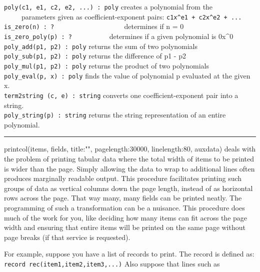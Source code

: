 \texttt{poly(c1, e1, c2, e2, ...) : poly} creates a polynomial from
the\\
 \ \ \ \ \ parameters given as coefficient-exponent pairs:
\texttt{c1x\^{}e1 + c2x\^{}e2 + ...}\\
\texttt{is\_zero(n) : ?
\ }\ \ \ \ \ \ \ \ \ \ \ \ \ \ \ \ \ \ determines if n = 0\\
\texttt{is\_zero\_poly(p) : ?} \ \ \ \ \ \ \ \ \ \ determines if a given
polynomial is 0x\^{}0\\
\texttt{poly\_add(p1, p2) : poly} returns the sum of two
polynomials\\
\texttt{poly\_sub(p1, p2) : poly} returns the difference of p1 -
p2\\
\texttt{poly\_mul(p1, p2) : poly} returns the product of two
polynomials\\
\texttt{poly\_eval(p, x) : poly} finds the value of polynomial p
evaluated at the given x.\\
\texttt{term2string (c, e) : string} converts one coefficient-exponent
pair into a string.\\
\texttt{poly\_string(p) : string} returns the string representation of
an entire polynomial. 

\vspace{0.25cm}\hrule{}

printcol(items, fields, title:"",
pagelength:30000, linelength:80, auxdata) deals with the problem of
printing tabular data where the total width of items to be printed is
wider than the page. Simply allowing the data to wrap to additional
lines often produces marginally readable output. This procedure
facilitates printing such groups of data as vertical columns down the
page length, instead of as horizontal rows across the page. That way
many, many fields can be printed neatly. The programming of such a
transformation can be a nuisance. This procedure does much of the work
for you, like deciding how many items can fit across the page width and
ensuring that entire items will be printed on the same page without
page breaks (if that service is requested).

For example, suppose you have a list of records to print. The record is
defined as:\\
\texttt{record rec(item1,item2,item3,...)} Also suppose that lines such
as


